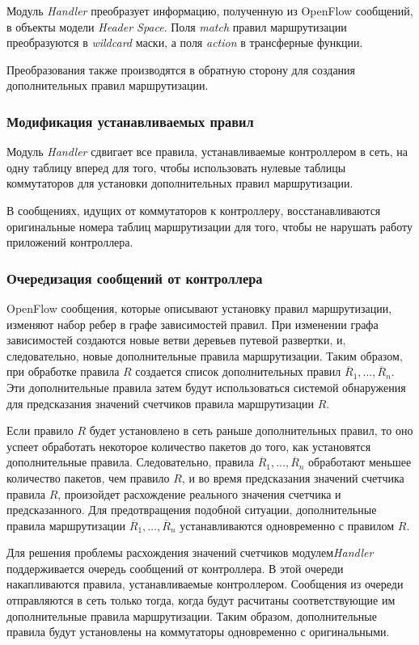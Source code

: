 \documentclass[../thesis.tex]{subfiles}
\begin{document}
Модуль \textit{Handler} преобразует информацию, полученную из OpenFlow сообщений, в объекты модели \textit{Header Space}.
Поля \textit{match} правил маршрутизации преобразуются в \textit{wildcard} маски, а поля \textit{action} в трансферные функции.

Преобразования также производятся в обратную сторону для создания дополнительных правил маршрутизации.

\subsubsection{Модификация устанавливаемых правил}

Модуль \textit{Handler} сдвигает все правила, устанавливаемые контроллером в сеть, на одну таблицу вперед для того, чтобы использовать нулевые таблицы коммутаторов для установки дополнительных правил маршрутизации.

В сообщениях, идущих от коммутаторов к контроллеру, восстанавливаются оригинальные номера таблиц маршрутизации для того, чтобы не нарушать работу приложений контроллера.

\subsubsection{Очередизация сообщений от контроллера}

OpenFlow сообщения, которые описывают установку правил маршрутизации, изменяют набор ребер в графе зависимостей правил.
При изменении графа зависимостей создаются новые ветви деревьев путевой развертки, и, следовательно, новые дополнительные правила маршрутизации.
Таким образом, при обработке правила $R$ создается список дополнительных правил $\overline{R}_1,\dots,\overline{R}_n$.
Эти дополнительные правила затем будут использоваться системой обнаружения для предсказания значений счетчиков правила маршрутизации $R$.

Если правило $R$ будет установлено в сеть раньше дополнительных правил, то оно успеет обработать некоторое количество пакетов до того, как установятся дополнительные правила.
Следовательно, правила $\overline{R}_1,\dots,\overline{R}_n$ обработают меньшее количество пакетов, чем правило $R$, и во время предсказания значений счетчика правила $R$, произойдет расхождение реального значения счетчика и предсказанного.
Для предотвращения подобной ситуации, дополнительные правила маршрутизации $\overline{R}_1,\dots,\overline{R}_n$ устанавливаются одновременно с правилом $R$.

Для решения проблемы расхождения значений счетчиков модулем\linebreak \textit{Handler} поддерживается очередь сообщений от контроллера.
В этой очереди накапливаются правила, устанавливаемые контроллером.
Сообщения из очереди отправляются в сеть только тогда, когда будут расчитаны соответствующие им дополнительные правила маршрутизации.
Таким образом, дополнительные правила будут установлены на коммутаторы одновременно с оригинальными.
\end{document}
